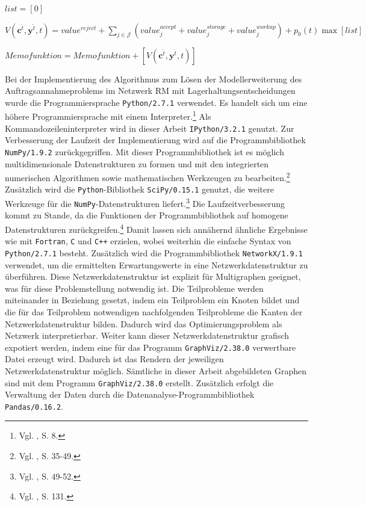 \begin{algorithm}[H]
{{{			}
			$list = [0]$\\
			
		$V(\textbf{c}^{\hat t},\textbf{y}^{\hat t},t)=value^{reject} + \sum_{j\in\mathcal{J}}(value_j^{accept}+value_j^{storage}+value_j^{workup})+p_0(t)\max [list]$}
	$Memofunktion = Memofunktion+[V(\textbf{c}^{\hat t},\textbf{y}^{\hat t},t)]$}
\end{algorithm}

Bei der Implementierung des Algorithmus zum Lösen der Modellerweiterung des Auftragsannahmeproblems im Netzwerk RM mit Lagerhaltungsentscheidungen wurde die Programmiersprache \texttt{Python/2.7.1} verwendet. Es handelt sich um eine höhere Programmiersprache mit einem Interpreter.\footnote{Vgl. \cite{:2005aa}, S. 8.} Als  Kommandozeileninterpreter wird in dieser Arbeit \texttt{IPython/3.2.1} genutzt. Zur Verbesserung der Laufzeit der Implementierung wird auf die Programmbibliothek \texttt{NumPy/}\texttt{1.9.2} zurückgegriffen. Mit dieser Programmbibliothek ist es möglich multidimensionale Datenstrukturen zu formen und mit den integrierten numerischen Algorithmen sowie mathematischen Werkzeugen zu bearbeiten.\footnote{Vgl. \cite{lindblad2013numpy}, S. 35-49.} Zusätzlich wird die \texttt{Python}-Bibliothek \texttt{SciPy/0.15.1} genutzt, die weitere Werkzeuge für die \texttt{NumPy}-Datenstrukturen liefert.\footnote{Vgl. \cite{lindblad2013numpy}, S. 49-52.} Die Laufzeitverbesserung kommt zu Stande, da die Funktionen der Programmbibliothek auf homogene Datenstrukturen zurückgreifen.\footnote{Vgl. \cite{:2006aa}, S. 131.} Damit lassen sich annähernd ähnliche Ergebnisse wie mit \texttt{Fortran}, \texttt{C} und \texttt{C++} erzielen, wobei weiterhin die einfache Syntax von \texttt{Python/2.7.1} besteht. Zusätzlich wird die Programmbibliothek \texttt{NetworkX/1.9.1} verwendet, um die ermittelten Erwartungswerte in eine Netzwerkdatenstruktur zu überführen. Diese Netzwerkdatenstruktur ist explizit für Multigraphen geeignet, was für diese Problemstellung notwendig ist. Die Teilprobleme werden miteinander in Beziehung gesetzt, indem ein Teilproblem ein Knoten bildet und die für das Teilproblem notwendigen nachfolgenden Teilprobleme die Kanten der Netzwerkdatenstruktur bilden. Dadurch wird das Optimierungsproblem als Netzwerk interpretierbar. Weiter kann dieser Netzwerkdatenstruktur grafisch expotiert werden, indem eine für das Programm \texttt{GraphViz/2.38.0} verwertbare Datei erzeugt wird. Dadurch ist das Rendern der jeweiligen Netzwerkdatenstruktur möglich. Sämtliche in dieser Arbeit abgebildeten Graphen sind mit dem Programm \texttt{GraphViz/2.38.0} erstellt. Zusätzlich erfolgt die Verwaltung der Daten durch die Datenanalyse-Programmbibliothek \texttt{Pandas/0.16.2}.

